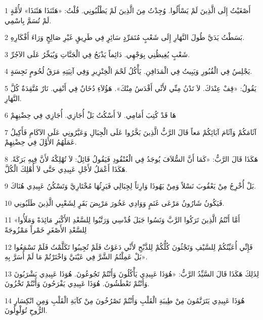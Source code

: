 \par 1 أَصْغَيْتُ إِلَى الَّذِينَ لَمْ يَسْأَلُوا. وُجِدْتُ مِنَ الَّذِينَ لَمْ يَطْلُبُونِي. قُلْتُ: «هَئَنَذَا هَئَنَذَا» لأُمَّةٍ لَمْ تُسَمَّ بِاسْمِي.
\par 2 بَسَطْتُ يَدَيَّ طُولَ النَّهَارِ إِلَى شَعْبٍ مُتَمَرِّدٍ سَائِرٍ فِي طَرِيقٍ غَيْرِ صَالِحٍ وَرَاءَ أَفْكَارِهِ.
\par 3 شَعْبٍ يُغِيظُنِي بِوَجْهِي. دَائِماً يَذْبَحُ فِي الْجَنَّاتِ وَيُبَخِّرُ عَلَى الآجُرِّ.
\par 4 يَجْلِسُ فِي الْقُبُورِ وَيَبِيتُ فِي الْمَدَافِنِ. يَأْكُلُ لَحْمَ الْخِنْزِيرِ وَفِي آنِيَتِهِ مَرَقُ لُحُومٍ نَجِسَةٍ.
\par 5 يَقُولُ: «قِفْ عِنْدَكَ. لاَ تَدْنُ مِنِّي لأَنِّي أَقْدَسُ مِنْكَ». هَؤُلاَءِ دُخَانٌ فِي أَنْفِي. نَارٌ مُتَّقِدَةٌ كُلَّ النَّهَارِ.
\par 6 هَا قَدْ كُتِبَ أَمَامِي. لاَ أَسْكُتُ بَلْ أُجَازِي. أُجَازِي فِي حِضْنِهِمْ
\par 7 آثَامَكُمْ وَآثَامَ آبَائِكُمْ مَعاً قَالَ الرَّبُّ الَّذِينَ بَخَّرُوا عَلَى الْجِبَالِ وَعَيَّرُونِي عَلَى الآكَامِ فَأَكِيلُ عَمَلَهُمُ الأَوَّلَ فِي حِضْنِهِمْ.
\par 8 هَكَذَا قَالَ الرَّبُّ: «كَمَا أَنَّ السُّلاَفَ يُوجَدُ فِي الْعُنْقُودِ فَيَقُولُ قَائِلٌ: لاَ تُهْلِكْهُ لأَنَّ فِيهِ بَرَكَةً. هَكَذَا أَعْمَلُ لأَجْلِ عَبِيدِي حَتَّى لاَ أُهْلِكَ الْكُلَّ.
\par 9 بَلْ أُخْرِجُ مِنْ يَعْقُوبَ نَسْلاً وَمِنْ يَهُوذَا وَارِثاً لِجِبَالِي فَيَرِثُهَا مُخْتَارِيَّ وَتَسْكُنُ عَبِيدِي هُنَاكَ.
\par 10 فَيَكُونُ شَارُونُ مَرْعَى غَنَمٍ وَوَادِي عَخُورَ مَرْبِضَ بَقَرٍ لِشَعْبِي الَّذِينَ طَلَبُونِي.
\par 11 «أَمَّا أَنْتُمُ الَّذِينَ تَرَكُوا الرَّبَّ وَنَسُوا جَبَلَ قُدْسِي وَرَتَّبُوا لِلسَّعْدِ الأَكْبَرِ مَائِدَةً وَمَلَأُوا لِلسَّعْدِ الأَصْغَرِ خَمْراً مَمْزُوجَةً
\par 12 فَإِنِّي أُعَيِّنُكُمْ لِلسَّيْفِ وَتَجْثُونَ كُلُّكُمْ لِلذَّبْحِ لأَنِّي دَعَوْتُ فَلَمْ تُجِيبُوا تَكَلَّمْتُ فَلَمْ تَسْمَعُوا بَلْ عَمِلْتُمُ الشَّرَّ فِي عَيْنَيَّ وَاخْتَرْتُمْ مَا لَمْ أُسَرَّ بِهِ».
\par 13 لِذَلِكَ هَكَذَا قَالَ السَّيِّدُ الرَّبُّ: «هُوَذَا عَبِيدِي يَأْكُلُونَ وَأَنْتُمْ تَجُوعُونَ. هُوَذَا عَبِيدِي يَشْرَبُونَ وَأَنْتُمْ تَعْطَشُونَ. هُوَذَا عَبِيدِي يَفْرَحُونَ وَأَنْتُمْ تَخْزُونَ.
\par 14 هُوَذَا عَبِيدِي يَتَرَنَّمُونَ مِنْ طِيبَةِ الْقَلْبِ وَأَنْتُمْ تَصْرُخُونَ مِنْ كآبَةِ الْقَلْبِ وَمِنِ انْكِسَارِ الرُّوحِ تُوَلْوِلُونَ.
